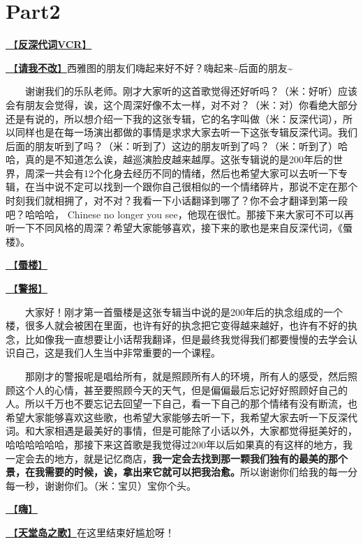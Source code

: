 \documentclass[]{ctexbook}
\begin{document}
\section{Part2}\label{Seattle-20250305-part2}

\hyperref[senself-vcr]{🎥【\textbf{反深代词VCR}】}

\hyperref[brave-heart]{🎵【\textbf{请我不改}】}西雅图的朋友们嗨起来好不好？嗨起来\textasciitilde 后面的朋友\textasciitilde{}

  谢谢我们的乐队老师。刚才大家听的这首歌觉得还好听吗？（米：好听）应该会有朋友会觉得，诶，这个周深好像不太一样，对不对？（米：对）你看绝大部分还是有说的，所以想介绍一下我的这张专辑，它的名字叫做（米：反深代词），所以同样也是在每一场演出都做的事情是求求大家去听一下这张专辑反深代词。我们后面的朋友听到了吗？（米：听到了）这边的朋友听到了吗？（米：听到了）哈哈，真的是不知道怎么诶，越巡演脸皮越来越厚。这张专辑说的是200年后的世界，周深一共会有12个化身去经历不同的情绪，然后也希望大家可以去听一下专辑，在当中说不定可以找到一个跟你自己很相似的一个情绪碎片，那说不定在那个时刻我们就相拥了，对不对？我看一下小话翻译到哪了？你不会才翻译到第一段吧？哈哈哈， Chinese no longer you see，他现在很忙。那接下来大家可不可以再听一下不同风格的周深？希望大家能够喜欢，接下来的歌也是来自反深代词，《蜃楼》。

\hyperref[mirage]{🎵【\textbf{蜃楼}】}

\hyperref[the-giver]{🎵【\textbf{警报}】}

  大家好！刚才第一首蜃楼是这张专辑当中说的是200年后的执念组成的一个楼，很多人就会被困在里面，也许有好的执念把它变得越来越好，也许有不好的执念，比如像我一直想要让小话帮我翻译，但是最终我觉得我们都要慢慢的去学会认识自己，这是我们人生当中非常重要的一个课程。

  那刚才的警报呢是唱给所有，就是照顾所有人的环境，所有人的感受，然后照顾这个人的心情，甚至要照顾今天的天气，但是偏偏最后忘记好好照顾好自己的人。所以千万也不要忘记去回望一下自己，看一下自己的那个情绪有没有断流，也希望大家能够喜欢这些歌，也希望大家能够去听一下，我希望大家去听一下反深代词。和大家相遇是最美好的事情，但是可能除了小话以外，大家都觉得挺美好的，哈哈哈哈哈哈，那接下来这首歌是我觉得过200年以后如果真的有这样的地方，我一定会去的地方，就是记忆商店，\textbf{我一定会去找到那一颗我们独有的最美的那个景，在我需要的时候，诶，拿出来它就可以把我治愈。}所以谢谢你们给我的每一分每一秒，谢谢你们。（米：宝贝）宝你个头。

\hyperref[say-hi]{🎵【\textbf{嗨}】}

\hyperref[haven-song]{🎵【\textbf{天堂岛之歌}】}在这里结束好尴尬呀！
\end{document}
